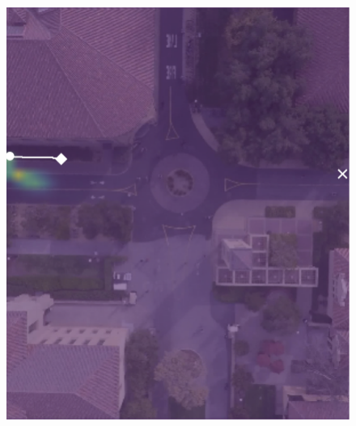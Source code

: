 \documentclass[letterpaper,10pt,conference]{ieeeconf}
\begin{document}
\begin{figure}
	\vspace{0.5cm}	
	\begin{minipage}[t]{0.5cm}
	\end{minipage}
	\begin{minipage}[t]{0.3\linewidth}
		\includegraphics[width=\linewidth]{./figures/comparison/kit_death_1_2_t=70.png}
	\end{minipage}
	\begin{minipage}[t]{0.3\linewidth}

\end{minipage}
\end{figure}
\end{document}
